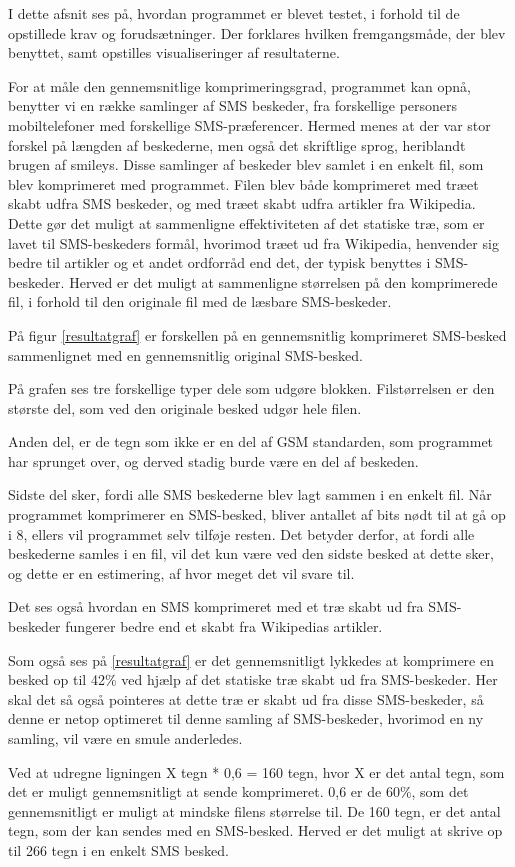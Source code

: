 I dette afsnit ses på, hvordan programmet er blevet testet, i forhold til de opstillede krav og 
forudsætninger. Der forklares hvilken fremgangsmåde, der blev benyttet, samt opstilles visualiseringer af 
resultaterne.

For at måle den gennemsnitlige komprimeringsgrad, programmet kan opnå, benytter vi en række samlinger 
af SMS beskeder, fra forskellige personers mobiltelefoner med forskellige SMS-præferencer. Hermed menes at der 
var stor forskel på længden af beskederne, men også det skriftlige sprog, heriblandt brugen af 
smileys.
Disse samlinger af beskeder blev samlet i en enkelt fil, som blev komprimeret med programmet.
Filen blev både komprimeret med træet skabt udfra SMS beskeder, og med træet skabt udfra 
artikler fra Wikipedia. Dette gør det muligt at sammenligne effektiviteten af det statiske træ, som 
er lavet til SMS-beskeders formål, hvorimod træet ud fra Wikipedia, henvender sig bedre til artikler og et 
andet ordforråd end det, der typisk benyttes i SMS-beskeder.
Herved er det muligt at sammenligne størrelsen på den komprimerede fil, i forhold til den originale fil 
med de læsbare SMS-beskeder.

På figur \ref{resultatgraf} er forskellen på en gennemsnitlig komprimeret SMS-besked sammenlignet med en 
gennemsnitlig original SMS-besked.

På grafen ses tre forskellige typer dele som udgøre blokken. Filstørrelsen er den største del, som ved den 
originale besked udgør hele filen.

Anden del, er de tegn som ikke er en del af GSM standarden, som programmet har sprunget over, og derved 
stadig burde være en del af beskeden.

Sidste del sker, fordi alle SMS beskederne blev lagt sammen i en enkelt fil. Når programmet komprimerer en SMS-besked, bliver 
antallet af bits nødt til at gå op i 8, ellers vil programmet selv tilføje resten. Det betyder derfor, at 
fordi alle beskederne samles i en fil, vil det kun være ved den sidste besked at dette sker, og dette er 
en estimering, af hvor meget det vil svare til.

Det ses også hvordan en SMS komprimeret med et træ skabt ud fra SMS-beskeder fungerer bedre end et skabt 
fra Wikipedias artikler.



Som også ses på \ref{resultatgraf} er det gennemsnitligt lykkedes at komprimere en besked op til 42\% ved 
hjælp af det statiske træ skabt ud fra SMS-beskeder.
Her skal det så også pointeres at dette træ er skabt ud fra disse SMS-beskeder, så denne er netop optimeret 
til denne samling af SMS-beskeder, hvorimod en ny samling, vil være en smule anderledes.

Ved at udregne ligningen X tegn * 0,6 = 160 tegn, hvor X er det antal tegn, som det er muligt 
gennemsnitligt at sende komprimeret. 0,6 er de 60\%, som det gennemsnitligt er muligt at mindske filens 
størrelse til. De 160 tegn, er det antal tegn, som der kan sendes med en SMS-besked.
Herved er det muligt at skrive op til 266 tegn i en enkelt SMS besked.
